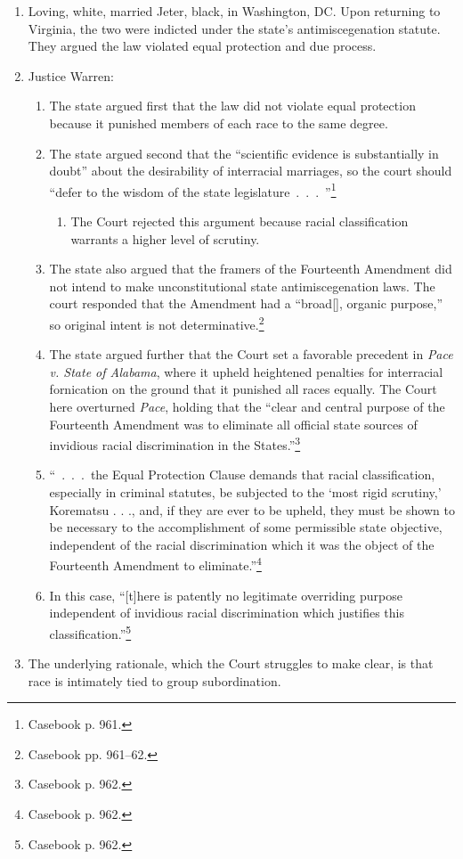\begin{enumerate}
    \item Loving, white, married Jeter, black, in Washington, DC. Upon 
    returning to Virginia, the two were indicted under the state's 
    antimiscegenation statute. They argued the law violated equal protection 
    and due process.
    \item Justice Warren:
    \begin{enumerate}
        \item The state argued first that the law did not violate equal 
        protection because it punished members of each race to the same 
        degree.
        \item The state argued second that the ``scientific evidence is 
        substantially in doubt'' about the desirability of interracial 
        marriages, so the court should ``defer to the wisdom of the state 
        legislature~.~.~.~''\footnote{Casebook p. 961.}
        \begin{enumerate}
            \item The Court rejected this argument because racial 
            classification warrants a higher level of scrutiny.
        \end{enumerate}
        \item The state also argued that the framers of the Fourteenth 
        Amendment did not intend to make unconstitutional state 
        antimiscegenation laws. The court responded that the Amendment had a 
        ``broad[], organic purpose,'' so original intent is not 
        determinative.\footnote{Casebook pp. 961--62.}
        \item The state argued further that the Court set a favorable 
        precedent in \emph{Pace v. State of Alabama}, where it upheld 
        heightened penalties for interracial fornication on the ground that it 
        punished all races equally. The Court here overturned \emph{Pace}, 
        holding that the ``clear and central purpose of the Fourteenth 
        Amendment was to eliminate all official state sources of invidious 
        racial discrimination in the States.''\footnote{Casebook p. 962.}
        \item ``~.~.~.~the Equal Protection Clause demands that racial 
        classification, especially in criminal statutes, be subjected to the 
        `most rigid scrutiny,' Korematsu . . ., and, if they are ever to be 
        upheld, they must be shown to be necessary to the accomplishment of 
        some permissible state objective, independent of the racial 
        discrimination which it was the object of the Fourteenth Amendment to 
        eliminate.''\footnote{Casebook p. 962.}
        \item In this case, ``[t]here is patently no legitimate overriding 
        purpose independent of invidious racial discrimination which justifies 
        this classification.''\footnote{Casebook p. 962.}
    \end{enumerate}
    \item The underlying rationale, which the Court struggles to make clear, 
    is that race is intimately tied to group subordination.
\end{enumerate}

